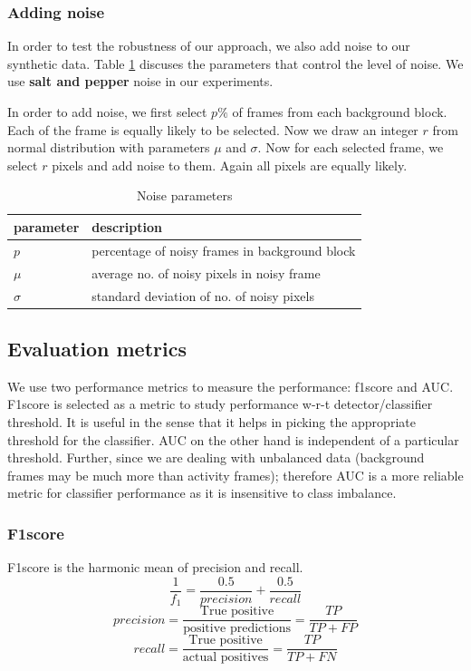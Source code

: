 \subsubsection{Adding noise}
In order to test the robustness of our approach, we also add noise to our synthetic data. Table \ref{table:noise-params} discuses the parameters that control the level of noise. We use \textbf{salt and pepper} noise in our experiments.

In order to add noise, we first select $p\%$ of frames from each background block. Each of the frame is equally likely to be selected. Now we draw an integer $r$ from normal distribution with parameters $\mu$ and $\sigma$. Now for each selected frame, we select $r$ pixels and add noise to them. Again all pixels are equally likely. 

\begin{table}
\centering
\label{table:noise-params}
\caption{Noise parameters}  \vspace{5pt}
\begin{tabular}{|l|l|}
\hline
parameter & description                              \\ \hline \hline
$p$         & percentage of noisy frames in background block  \\ 
$\mu$        & average no. of noisy pixels in noisy frame     \\ 
$\sigma$     & standard deviation of no. of noisy pixels     \\ \hline
\end{tabular}
\end{table}

\subsection{Evaluation metrics}
We use two performance metrics to measure the performance: f1score and AUC. F1score is selected as a metric to study performance w-r-t detector/classifier threshold. It is useful in the sense that it helps in picking the appropriate threshold for the classifier. AUC on the other hand is independent of a particular threshold. Further, since we are dealing with unbalanced data (background frames may be much more than activity frames); therefore AUC is a more reliable metric for classifier performance as it is insensitive to class imbalance.  
\subsubsection{F1score}
F1score is the harmonic mean of precision and recall. 
$$\frac{1}{f_1} = \frac{0.5}{precision} +  \frac{0.5}{recall} $$
$$precision = \frac{\text{True positive}}{\text{positive predictions}} =  \frac{TP}{TP + FP}$$
$$recall = \frac{\text{True positive}}{\text{actual positives}} =  \frac{TP}{TP + FN}$$

